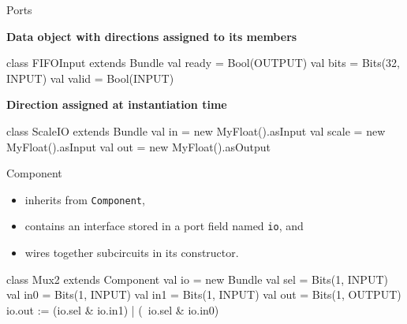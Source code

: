 \documentclass[xcolor=pdflatex,dvipsnames,table]{beamer}
\begin{document}
\begin{frame}[fragile]{Ports}

\textbf{Data object with directions assigned to its members}

\begin{scala}
class FIFOInput extends Bundle {
  val ready = Bool(OUTPUT)
  val bits  = Bits(32, INPUT)
  val valid = Bool(INPUT)
}
\end{scala}

\textbf{Direction assigned at instantiation time}

\begin{scala}
class ScaleIO extends Bundle {
  val in    = new MyFloat().asInput
  val scale = new MyFloat().asInput
  val out   = new MyFloat().asOutput
}
\end{scala}
\end{frame}

\begin{frame}[fragile]{Component}

\begin{itemize}
\item inherits from \verb+Component+,
\item contains an interface stored in a port field named \verb+io+, and
\item wires together subcircuits in its constructor.
\end{itemize}

\begin{scala}
class Mux2 extends Component {
  val io = new Bundle{
    val sel = Bits(1, INPUT)
    val in0 = Bits(1, INPUT)
    val in1 = Bits(1, INPUT)
    val out = Bits(1, OUTPUT)
  }
  io.out := (io.sel & io.in1) | (~io.sel & io.in0)
}
\end{scala}

\end{frame}
\end{document}
